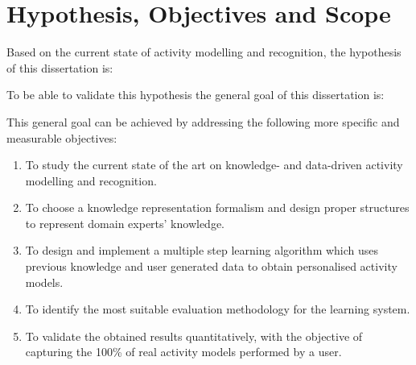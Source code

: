 \section{Hypothesis, Objectives and Scope}
\label{sec:intro:hypothesis}


Based on the current state of activity modelling and recognition, the hypothesis of this dissertation is:

\vspace{0.5cm}

\noindent{}

\vspace{0.5cm}

To be able to validate this hypothesis the general goal of this dissertation is:

\vspace{0.5cm}

\noindent{}

\vspace{0.5cm}



This general goal can be achieved by addressing the following more specific and measurable objectives:

\begin{enumerate}
 \item To study the current state of the art on knowledge- and data-driven activity modelling and recognition.
 \item To choose a knowledge representation formalism and design proper structures to represent domain experts' knowledge.
 \item To design and implement a multiple step learning algorithm which uses previous knowledge and user generated data to obtain personalised activity models.
 \item To identify the most suitable evaluation methodology for the learning system.
 \item To validate the obtained results quantitatively, with the objective of capturing the 100\% of real activity models performed by a user. 
\end{enumerate}

